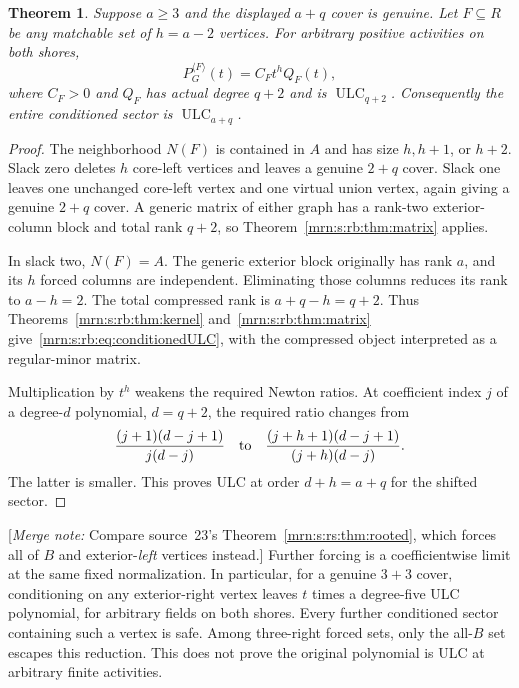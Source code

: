 \documentclass[11pt,a4paper]{article}
\newtheorem{theorem}{Theorem}[section]
\theoremstyle{remark}\newtheorem{remark}[theorem]{Remark}
\newcommand{\ULC}{\operatorname{ULC}}      %
\newcommand{\mnote}[1]{[\textit{Merge note:} #1]}
\begin{document}
\begin{theorem}\label{mrn:s:rb:thm:cover}
Suppose $a\ge3$ and the displayed $a+q$ cover is genuine. Let $F\subseteq R$ be any matchable set of $h=a-2$ vertices. For arbitrary positive activities on both shores,
\begin{equation}\label{mrn:s:rb:eq:conditionedULC}
 P_G^{\langle F\rangle}(t)=C_Ft^hQ_F(t),
\end{equation}
where $C_F>0$ and $Q_F$ has actual degree $q+2$ and is $\ULC_{q+2}$. Consequently the entire conditioned sector is $\ULC_{a+q}$.
\end{theorem}
\begin{proof}
The neighborhood $N(F)$ is contained in $A$ and has size $h,h+1$, or $h+2$. Slack zero deletes $h$ core-left vertices and leaves a genuine $2+q$ cover. Slack one leaves one unchanged core-left vertex and one virtual union vertex, again giving a genuine $2+q$ cover. A generic matrix of either graph has a rank-two exterior-column block and total rank $q+2$, so Theorem~\ref{mrn:s:rb:thm:matrix} applies.

In slack two, $N(F)=A$. The generic exterior block originally has rank $a$, and its $h$ forced columns are independent. Eliminating those columns reduces its rank to $a-h=2$. The total compressed rank is $a+q-h=q+2$. Thus Theorems~\ref{mrn:s:rb:thm:kernel} and~\ref{mrn:s:rb:thm:matrix} give~\eqref{mrn:s:rb:eq:conditionedULC}, with the compressed object interpreted as a regular-minor matrix.

Multiplication by $t^h$ weakens the required Newton ratios. At coefficient index $j$ of a degree-$d$ polynomial, $d=q+2$, the required ratio changes from
\[
 \frac{(j+1)(d-j+1)}{j(d-j)}
 \quad\hbox{to}\quad
 \frac{(j+h+1)(d-j+1)}{(j+h)(d-j)}.
\]
The latter is smaller. This proves ULC at order $d+h=a+q$ for the shifted sector.
\end{proof}
\mnote{Compare source~23's Theorem~\ref{mrn:s:rs:thm:rooted}, which forces all of $B$ and exterior-\emph{left} vertices instead.} Further forcing is a coefficientwise limit at the same fixed normalization. In particular, for a genuine $3+3$ cover, conditioning on any exterior-right vertex leaves $t$ times a degree-five ULC polynomial, for arbitrary fields on both shores. Every further conditioned sector containing such a vertex is safe. Among three-right forced sets, only the all-$B$ set escapes this reduction. This does not prove the original polynomial is ULC at arbitrary finite activities.
\end{document}
